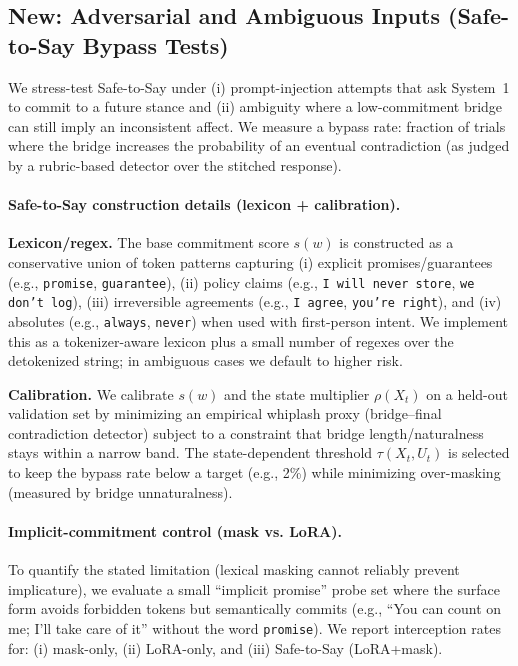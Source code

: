 \documentclass{article}
\begin{document}
\subsection{New: Adversarial and Ambiguous Inputs (Safe-to-Say Bypass Tests)}
\label{app:adversarial}
We stress-test Safe-to-Say under (i) prompt-injection attempts that ask System~1 to commit to a future stance and (ii) ambiguity where a low-commitment bridge can still imply an inconsistent affect.
We measure a bypass rate: fraction of trials where the bridge increases the probability of an eventual contradiction (as judged by a rubric-based detector over the stitched response).

\paragraph{Safe-to-Say construction details (lexicon + calibration).}
\textbf{Lexicon/regex.} The base commitment score $s(w)$ is constructed as a conservative union of token patterns capturing (i) explicit promises/guarantees (e.g., \texttt{promise}, \texttt{guarantee}), (ii) policy claims (e.g., \texttt{I will never store}, \texttt{we don't log}), (iii) irreversible agreements (e.g., \texttt{I agree}, \texttt{you're right}), and (iv) absolutes (e.g., \texttt{always}, \texttt{never}) when used with first-person intent.
We implement this as a tokenizer-aware lexicon plus a small number of regexes over the detokenized string; in ambiguous cases we default to higher risk.

\textbf{Calibration.} We calibrate $s(w)$ and the state multiplier $\rho(X_t)$ on a held-out validation set by minimizing an empirical whiplash proxy (bridge--final contradiction detector) subject to a constraint that bridge length/naturalness stays within a narrow band.
The state-dependent threshold $\tau(X_t,U_t)$ is selected to keep the bypass rate below a target (e.g., 2\%) while minimizing over-masking (measured by bridge unnaturalness).

\paragraph{Implicit-commitment control (mask vs. LoRA).}
To quantify the stated limitation (lexical masking cannot reliably prevent implicature), we evaluate a small ``implicit promise'' probe set where the surface form avoids forbidden tokens but semantically commits (e.g., ``You can count on me; I'll take care of it'' without the word \texttt{promise}).
We report interception rates for: (i) mask-only, (ii) LoRA-only, and (iii) Safe-to-Say (LoRA+mask).
\end{document}
